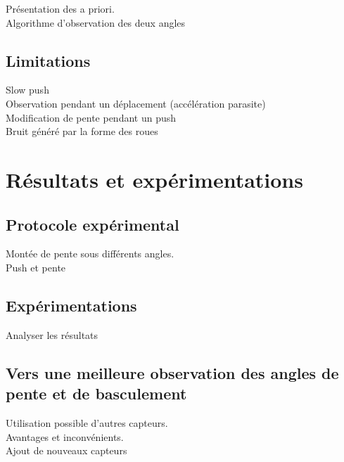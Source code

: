 Présentation des a priori.\\
Algorithme d'observation des deux angles

\subsection{Limitations}

Slow push\\
Observation pendant un déplacement (accélération parasite)\\
Modification de pente pendant un push\\
Bruit généré par la forme des roues

\section{Résultats et expérimentations}
\subsection{Protocole expérimental}

Montée de pente sous différents angles.\\
Push et pente

\subsection{Expérimentations}

Analyser les résultats

\subsection{Vers une meilleure observation des angles de pente et de basculement}

Utilisation possible d'autres capteurs.\\
Avantages et inconvénients.\\
Ajout de nouveaux capteurs